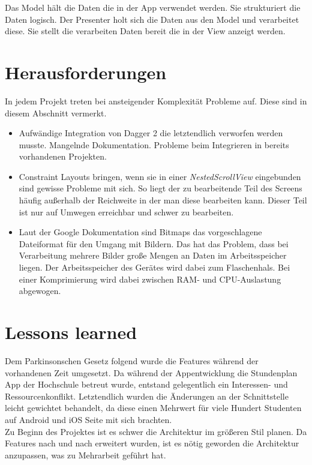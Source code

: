 \documentclass[
    DIV12,
    cleardouble=plain,
    headings=normal,
    pdftex,
    headexclude,footexclude,
    final
]{scrreprt}
\begin{document}
Das Model hält die Daten die in der App verwendet werden. Sie strukturiert die Daten logisch. Der Presenter holt sich die Daten aus den Model und verarbeitet diese. Sie stellt die verarbeiten Daten bereit die in der View anzeigt werden.

\newpage

\chapter{Herausforderungen}
In jedem Projekt treten bei ansteigender Komplexität Probleme auf. Diese sind in diesem Abschnitt vermerkt.

\begin{itemize}
\item Aufwändige Integration von Dagger 2 die letztendlich verworfen werden musste. Mangelnde Dokumentation. Probleme beim Integrieren in bereits vorhandenen Projekten.
\item Constraint Layouts bringen, wenn sie in einer \textit{NestedScrollView} eingebunden sind gewisse Probleme mit sich. So liegt der zu bearbeitende Teil des Screens häufig außerhalb der Reichweite in der man diese bearbeiten kann. Dieser Teil ist nur auf Umwegen erreichbar und schwer zu bearbeiten.
\item Laut der Google Dokumentation sind Bitmaps das vorgeschlagene Dateiformat für den Umgang mit Bildern. Das hat das Problem, dass bei Verarbeitung mehrere Bilder große Mengen an Daten im Arbeitsspeicher liegen. Der Arbeitsspeicher des Gerätes wird dabei zum Flaschenhals. Bei einer Komprimierung wird dabei zwischen RAM- und CPU-Auslastung abgewogen.
\end{itemize}

\newpage

\chapter{Lessons learned}
Dem Parkinsonschen Gesetz folgend wurde die Features während der vorhandenen Zeit umgesetzt. Da während der Appentwicklung die Stundenplan App der Hochschule betreut wurde, entstand gelegentlich ein Interessen- und Ressourcenkonflikt. Letztendlich wurden die Änderungen an der Schnittstelle leicht gewichtet behandelt, da diese einen Mehrwert für viele Hundert Studenten auf Android und iOS Seite mit sich brachten.\\
Zu Beginn des Projektes ist es schwer die Architektur im größeren Stil planen. Da Features nach und nach erweitert wurden, ist es nötig geworden die Architektur anzupassen, was zu Mehrarbeit geführt hat.
\end{document}
